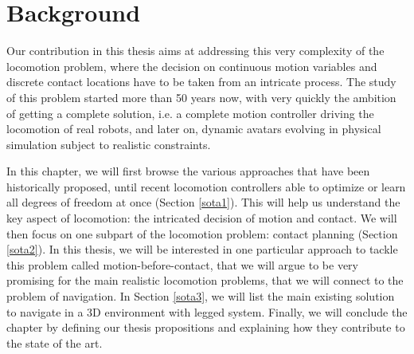 

\chapter{Background}
\label{sec:sota}
\minitoc
\bigskip



Our contribution in this thesis aims at addressing this very complexity of the locomotion problem, where the decision on continuous motion variables and discrete contact locations have to be taken from an intricate process.
The study of this problem started more than 50 years now, with very quickly the ambition of getting a complete solution, i.e. a complete motion controller driving the locomotion of real robots, and later on, dynamic avatars evolving in physical simulation subject to realistic constraints.

In this chapter, we will first browse the various approaches that have been historically proposed, until recent locomotion controllers able to optimize or learn all degrees of freedom at once (Section \ref{sota1}).
This will help us understand the key aspect of locomotion: the intricated decision of motion and contact.
We will then focus on one subpart of the locomotion problem: contact planning (Section \ref{sota2}). In this thesis, we will be interested in one particular approach to tackle this problem called motion-before-contact, that we will argue to be very promising for the main realistic locomotion problems, that we will connect to the problem of navigation.
In Section \ref{sota3}, we will list the main existing solution to navigate in a 3D environment with legged system.
Finally, we will conclude the chapter by defining our thesis propositions and explaining how they contribute to the state of the art.



